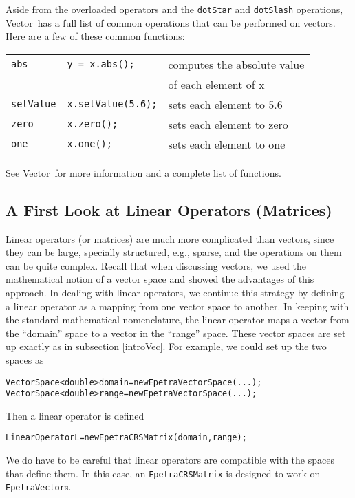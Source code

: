 \documentclass[12pt]{article}
\renewcommand{\vector}{{\sf Vector}}
\newcommand{\lcode}[1]{{\tt #1}}
\newenvironment{dcode}{  \begin{center} 
    \begin{minipage}{.9\textwidth}
     \begin{alltt}}
{\end{alltt}
    \end{minipage}
  \end{center}}
\newcommand{\bdcode}{\begin{dcode}}
\newcommand{\edcode}{\end{dcode}}
\begin{document}
Aside from the overloaded operators and the \lcode{dotStar} and
\lcode{dotSlash} operations, \vector\ has a full list of common
operations that can be performed on vectors.  Here are a few of these
common functions:

\vspace*{1ex}
\begin{tabular}{|l|l|l|} \hline
\lcode{abs} & \lcode{y = x.abs();} & computes the absolute value \\ && of each
element of x \\ \hline
\lcode{setValue} & \lcode{x.setValue(5.6);} & sets each element to 5.6
\\ \hline
\lcode{zero}  & \lcode{x.zero();} & sets each element to zero \\ \hline
\lcode{one}  & \lcode{x.one();}  &  sets each element to one \\ \hline
\end{tabular}
\vspace*{1ex}

\noindent See \vector\ for more information and a complete list of functions.



\subsection{A First Look at Linear Operators (Matrices)} \label{introLinOp}

Linear operators (or matrices) are much more complicated than vectors,
since they can be large, specially structured, e.g., sparse, and the
operations on them can be quite complex.  Recall that when discussing
vectors, we used the mathematical notion of a vector space and showed
the advantages of this approach.  In dealing with linear operators, we
continue this strategy by defining a linear operator as a mapping from
one vector space to another.  In keeping with the standard
mathematical nomenclature, the linear operator maps a vector from the
``domain'' space to a vector in the ``range'' space.  These vector
spaces are set up exactly as in subsection \ref{introVec}. For
example, we could set up the two spaces as 
\bdcode
VectorSpace<double> domain = new EpetraVectorSpace(...); 
VectorSpace<double> range  = new EpetraVectorSpace(...); 
\edcode
Then a linear operator is defined 
\bdcode
LinearOperator L = new EpetraCRSMatrix(domain, range);
\edcode

We do have to be careful that linear operators are compatible with the
spaces that define them.  In this case, an \lcode{EpetraCRSMatrix} is
designed to work on \lcode{EpetraVector}s.
\end{document}
